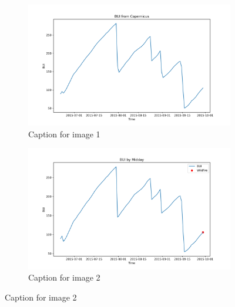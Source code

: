 \begin{figure}[h]
\caption{HELLo}
    \centering
    \begin{subfigure}{0.49\textwidth}
        \centering
        \includegraphics[width=\textwidth]{graphs/2015MesmoSitio/2015CopernicusBUI12.png}
        \caption{Caption for image 1}
        \label{fig:img1}
    \end{subfigure}
    \hfill
    \begin{subfigure}{0.49\textwidth}
        \centering
        \includegraphics[width=\textwidth]{graphs/2015MesmoSitio/2015CalcBUI12.png}
        \caption{Caption for image 2}
        \label{fig:img2}
    \end{subfigure}
    \label{fig:both_images}
\end{figure}

\FloatBarrier

